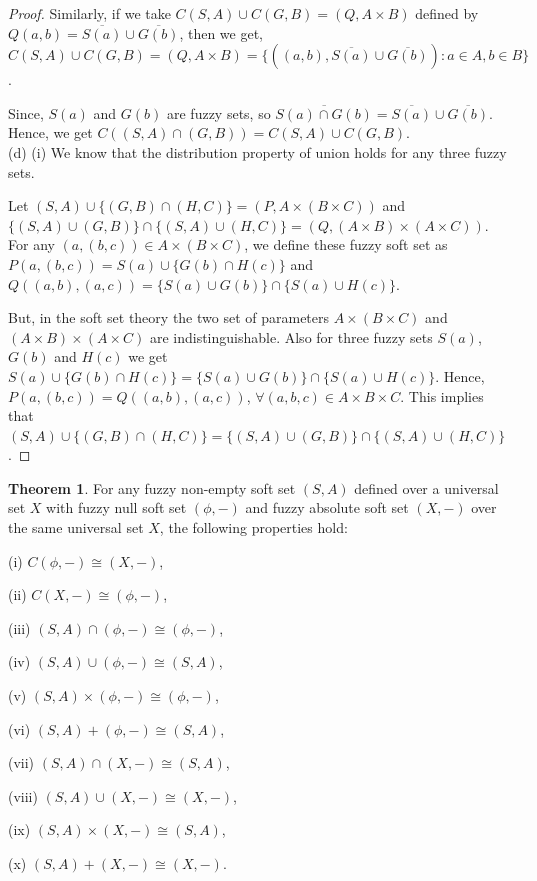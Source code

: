 \documentclass{article}
\theoremstyle{definition}
\newtheorem{theorem}{Theorem}[section]
\begin{document}
\begin{proof}
Similarly, if we take $C(S,A) \cup C(G,B)=(Q, A\times B)$ defined by $Q(a,b)=\overline{S(a)} \cup \overline{G(b)}$, then we get, $C(S,A) \cup C(G,B)=(Q, A\times B)=\{((a, b), \overline{S(a)}\cup \overline{G(b)}): a\in A, b\in B\}$.


 Since, $S(a)$ and $G(b)$ are fuzzy sets, so $\overline{S(a)\cap G(b)}=\overline{S(a)}\cup \overline{G(b)}$. Hence, we get $C((S,A) \cap (G,B)) = C(S,A) \cup C(G,B)$.\\

(d) (i) We know that the distribution property of union holds for any three fuzzy sets. 


 Let $(S, A)\cup \{(G, B) \cap (H,C)\}=(P, A\times(B\times C))$ and $\{(S, A) \cup (G,B)\} \cap \{(S, A) \cup (H,C)\}=(Q,(A\times B)\times (A\times C))$. For any $(a, (b, c))\in A\times (B\times C)$, we define these fuzzy soft set as $P(a,(b,c))=S(a)\cup\{G(b)\cap H(c)\}$ and $Q((a,b),(a,c))=\{S(a)\cup G(b)\}\cap \{S(a)\cup H(c)\}$.

 
 But, in the soft set theory the two set of parameters $A\times(B\times C)$ and $(A\times B)\times (A\times C)$ are indistinguishable. Also for three fuzzy sets $S(a)$, $G(b)$ and $H(c)$ we get $S(a)\cup\{G(b)\cap H(c)\}=\{S(a)\cup G(b)\}\cap \{S(a)\cup H(c)\}$. Hence, $P(a,(b,c))=Q((a,b),(a,c))$, $\forall (a,b,c)\in A\times B\times C$. This implies that $(S,A)\cup \{(G,B) \cap (H,C)\} = \{(S,A) \cup (G,B)\} \cap \{(S,A) \cup (H,C)\}$.
    
\end{proof}


\begin{theorem}
 For any fuzzy non-empty soft set $(S,A)$ defined over a universal set $X$ with fuzzy null soft set $(\phi , -)$ and fuzzy absolute soft set $(X , -)$ over the same universal set $X$, the following properties hold: 

 (i) $C(\phi, -) \cong (X, -)$,
 
 (ii) $C(X, -) \cong (\phi, -)$,
 
 (iii) $(S, A) \cap (\phi, -) \cong (\phi, -)$,

 (iv) $(S, A) \cup (\phi, -) \cong (S, A)$,

 (v) $(S, A) \times (\phi, -) \cong (\phi, -)$,

 (vi) $(S, A) + (\phi, -) \cong (S, A)$,

 (vii) $(S, A) \cap (X, -) \cong (S, A)$,

 (viii) $(S, A) \cup (X, -) \cong (X, -)$,

 (ix) $(S, A) \times (X, -) \cong (S, A)$,

 (x) $(S, A) + (X, -) \cong (X, -)$.

\end{theorem}
\end{document}

